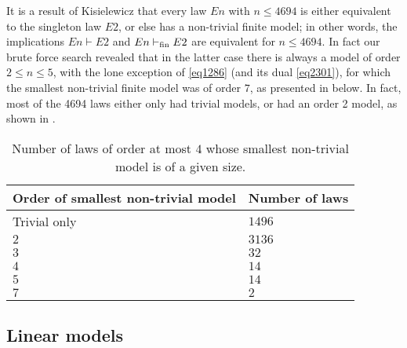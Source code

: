 
It is a result of Kisielewicz \cite{Kisielewicz} that every law $En$ with $n \leq 4694$ is either equivalent to the singleton law $E2$, or else has a non-trivial finite model; in other words, the implications $En \vdash E2$ and $En \vdash_{\mathrm{fin}} E2$ are equivalent for $n \leq 4694$.  In fact our brute force search revealed that in the latter case there is always a model of order $2 \leq n \leq 5$, with the lone exception of \eqref{eq1286} (and its dual \eqref{eq2301}), for which the smallest non-trivial finite model was of order $7$, as presented in  below.  In fact, most of the 4694 laws either only had trivial models, or had an order 2 model, as shown in .
\begin{table}
\centering
\begin{tabular}{ll}
  \hline
Order of smallest non-trivial model & Number of laws \\
\hline
Trivial only & $1496$ \\
$2$ & $3136$ \\
$3$ & $32$ \\
$4$ & $14$ \\
$5$ & $14$ \\
$7$ & $2$\\
\hline
\end{tabular}
\caption{Number of laws of order at most $4$ whose smallest non-trivial model is of a given size.}\label{size-table}
\end{table}
\subsection{Linear models}\label{linear-sec}

